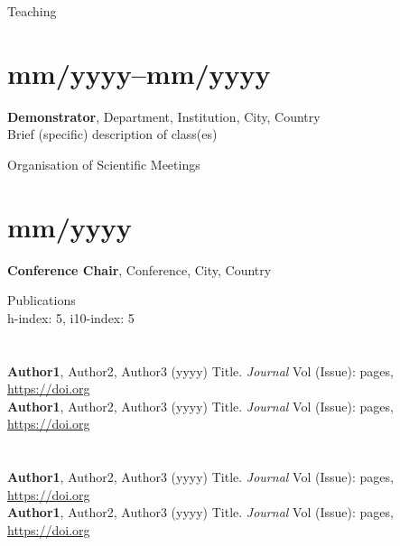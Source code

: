 \documentclass[margin,line,10pt]{res}
\begin{document}
\begin{resume}
\vspace*{-.2in}

{\sc Teaching}\\
\vspace*{-.35in}
\section{\sc mm/yyyy--mm/yyyy}{\bf Demonstrator}, Department, Institution, City, Country\\
Brief (specific) description of class(es)\\

\vspace*{-.2in}

{\sc Organisation of Scientific Meetings}\\
\vspace*{-.35in}
\section{\sc mm/yyyy}{\bf Conference Chair}, Conference, City, Country\\

\vspace*{-.2in}

{\sc Publications}\\
h-index: 5, i10-index: 5\\
\vspace*{-.35in}
\section{}
{\bf Author1}, Author2, Author3 (yyyy) Title. \textit{Journal} Vol (Issue): pages, \url{https://doi.org}\\
{\bf Author1}, Author2, Author3 (yyyy) Title. \textit{Journal} Vol (Issue): pages, \url{https://doi.org}\\      
\vspace*{-.35in}
\section{}
{\bf Author1}, Author2, Author3 (yyyy) Title. \textit{Journal} Vol (Issue): pages, \url{https://doi.org}\\
{\bf Author1}, Author2, Author3 (yyyy) Title. \textit{Journal} Vol (Issue): pages, \url{https://doi.org}\\

\end{resume}
\end{document}
